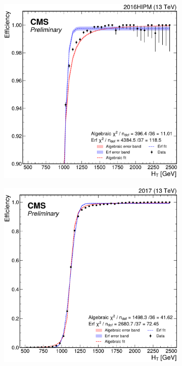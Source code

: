 \begin{figure}
\begin{subfigure}{.36\linewidth}
	\end{subfigure}%
	\begin{subfigure}{.36\linewidth}
		\includegraphics[width=\linewidth]{Images/pdfs/fits_closeup_16-APV-HIPM.pdf}
	\end{subfigure}
	\begin{subfigure}{.36\linewidth}
		\includegraphics[width=\linewidth]{Images/pdfs/fits_17.pdf}

\end{subfigure}
\end{figure}

